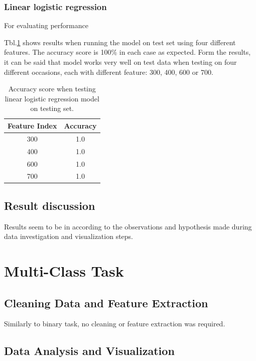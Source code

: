 \documentclass[11pt]{article}
\begin{document}
		\subsubsection{Linear logistic regression}
			For evaluating performance  

			Tbl.\ref{tbl:binary_test_table} shows results when running the model on test set using four different features. The accuracy score is 100\% in each case as expected. Form the results, it can be said that model works very well on test data when testing on four different occasions, each with different feature: 300, 400, 600 or 700.
			\begin{center}
		  	\begin{table}
		  	\centering
			\begin{tabular}[b]{|c | c|}
				 \hline
				 Feature Index 	 & Accuracy \\ 
 				 \hline
				 300 				& 1.0 	\\ 
				 400 				& 1.0 	\\ 
				 600		 		& 1.0 	\\ 
				 700				& 1.0 	\\ 
				 \hline
			\end{tabular}
			\caption{Accuracy score when testing linear logistic regression model on testing set.}
			\label{tbl:binary_test_table}
			\end{table}
		\end{center}
	\subsection{Result discussion}
		Results seem to be in according to the observations and hypothesis made during data investigation and visualization steps. 

	\section{Multi-Class Task}
		\subsection{Cleaning Data and Feature Extraction}
			Similarly to binary task, no cleaning or feature extraction was required.

		\subsection{Data Analysis and Visualization}
\end{document}
